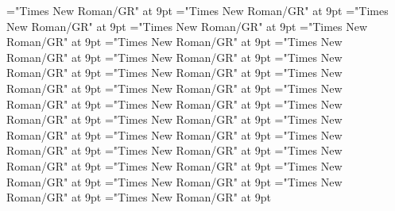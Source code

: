 \documentclass[gps1,twoside]{article}
\begin{document}
\font\spanowningentrysummarydefinitionvariantformentrybackrefvariantformentrybackrefssensesensesentrylastchildafter="Times New Roman/GR" at 9pt
\font\scientificnamesensesensesentryafter="Times New Roman/GR" at 9pt
\font\semanticdomainsemanticdomainsemanticdomainssensesensesentrybefore="Times New Roman/GR" at 9pt
\font\semanticdomainssensesensesentrybefore="Times New Roman/GR" at 9pt
\font\semanticdomainssensesensesentryafter="Times New Roman/GR" at 9pt
\font\spanspanabbreviationsemanticdomainsemanticdomainssensesensesentrybefore="Times New Roman/GR" at 9pt
\font\spanabbreviationsemanticdomainsemanticdomainssensesensesentrylastchildafter="Times New Roman/GR" at 9pt
\font\spanspannamesemanticdomainsemanticdomainssensesensesentrybefore="Times New Roman/GR" at 9pt
\font\academicdomainacademicdomainacademicdomainssensesensesentrybefore="Times New Roman/GR" at 9pt
\font\academicdomainssensesensesentrybefore="Times New Roman/GR" at 9pt
\font\academicdomainssensesensesentryafter="Times New Roman/GR" at 9pt
\font\spanspanabbreviationacademicdomainacademicdomainssensesensesentrybefore="Times New Roman/GR" at 9pt
\font\spanspannameacademicdomainacademicdomainssensesensesentrybefore="Times New Roman/GR" at 9pt
\font\spannameacademicdomainacademicdomainssensesensesentryfirstchildbefore="Times New Roman/GR" at 9pt
\font\spannameacademicdomainacademicdomainssensesensesentrylastchildafter="Times New Roman/GR" at 9pt
\font\usageusageusagessensesensesentrybefore="Times New Roman/GR" at 9pt
\font\usagessensesensesentrybefore="Times New Roman/GR" at 9pt
\font\usagessensesensesentryafter="Times New Roman/GR" at 9pt
\font\spanspanabbreviationusageusagessensesensesentrybefore="Times New Roman/GR" at 9pt
\font\complexformsnotsubentrycomplexformsnotsubentrycomplexformsnotsubentriessensesensesentrybefore="Times New Roman/GR" at 9pt
\font\complexformsnotsubentriessensesensesentryafter="Times New Roman/GR" at 9pt
\font\complexformtypescomplexformsnotsubentrycomplexformsnotsubentriessensesensesentryafter="Times New Roman/GR" at 9pt
\font\spanspanreverseabbrcomplexformtypecomplexformtypescomplexformsnotsubentrycomplexformsnotsubentriessensesensesentrybefore="Times New Roman/GR" at 9pt
\font\spanspanheadwordcomplexformsnotsubentrycomplexformsnotsubentriessensesensesentrybefore="Times New Roman/GR" at 9pt
\font\spanspanowningentrysummarydefinitioncomplexformsnotsubentrycomplexformsnotsubentriessensesensesentrybefore="Times New Roman/GR" at 9pt
\font\spanowningentrysummarydefinitioncomplexformsnotsubentrycomplexformsnotsubentriessensesensesentryfirstchildbefore="Times New Roman/GR" at 9pt
\end{document}
